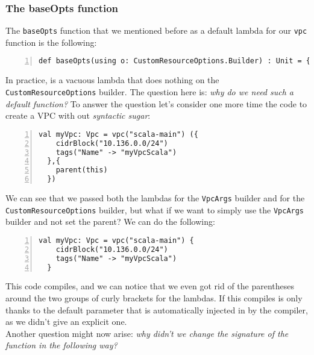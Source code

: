 \subsubsection{The baseOpts function}
The \texttt{baseOpts} function that we mentioned before as a default lambda for our \texttt{vpc} function is the following:\\
\begin{minipage}{\linewidth}
\begin{lstlisting}[numbers=left, numberstyle=\tiny, numbersep=-5pt, stepnumber=1]
  def baseOpts(using o: CustomResourceOptions.Builder) : Unit = {}
\end{lstlisting}
\end{minipage}
In practice, is a vacuous lambda that does nothing on the \texttt{CustomResourceOptions} builder.
The question here is: \textit{why do we need such a default function?}
To answer the question let's consider one more time the code to create a VPC with out \textit{syntactic sugar}:\\
\begin{minipage}{\linewidth}
\begin{lstlisting}[numbers=left, numberstyle=\tiny, numbersep=-5pt, stepnumber=1]
  val myVpc: Vpc = vpc("scala-main") ({
    cidrBlock("10.136.0.0/24")
    tags("Name" -> "myVpcScala")
  },{
    parent(this)
  })
\end{lstlisting}
\end{minipage}
We can see that we passed both the lambdas for the \texttt{VpcArgs} builder and for the \texttt{CustomResourceOptions} builder, but what if we want to simply use the \texttt{VpcArgs} builder and not set the parent?
We can do the following:\\
\begin{minipage}{\linewidth}
\begin{lstlisting}[numbers=left, numberstyle=\tiny, numbersep=-5pt, stepnumber=1]
  val myVpc: Vpc = vpc("scala-main") {
    cidrBlock("10.136.0.0/24")
    tags("Name" -> "myVpcScala")
  }
\end{lstlisting}
\end{minipage}
This code compiles, and we can notice that we even got rid of the parentheses around the two groups of curly brackets for the lambdas.
If this compiles is only thanks to the default parameter that is automatically injected in by the compiler, as we didn't give an explicit one.\\
\newline
Another question might now arise: \textit{why didn't we change the signature of the function in the following way?}\\
